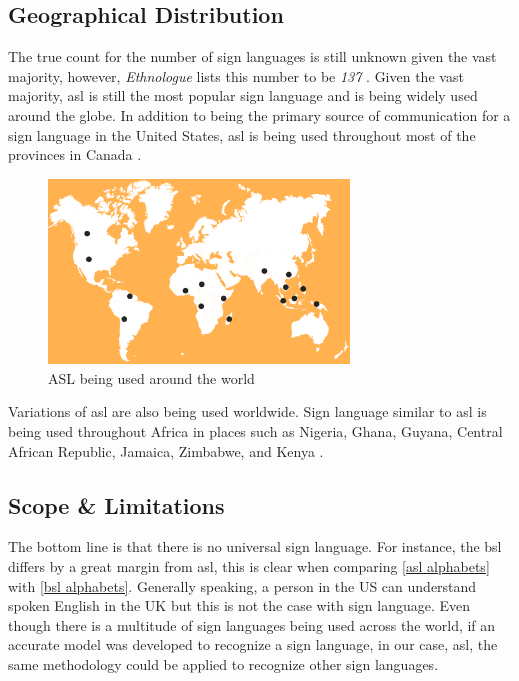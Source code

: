 \documentclass[twocolumn]{article}
\begin{document}
\subsection{Geographical Distribution}

The true count for the number of sign languages is still unknown given the 
vast majority, however, \textit{Ethnologue} \cite{ethnologue} lists this 
number to be \textit{137} \cite{fenlon2015sign}. Given the vast majority, 
\gls{asl} is still the most popular sign language and is being widely used 
around the globe. In addition to being the primary source of communication for 
a sign language in the United States, \gls{asl} is being used throughout most 
of the provinces in Canada \cite{al2010sign}.

\begin{figure}[h]
\centering
\includegraphics[width=8cm]{./figures/asl being used around the world}
\caption{ASL being used around the world}
\end{figure}

Variations of \gls{asl} are also being used worldwide. Sign language 
similar to \gls{asl} is being used throughout Africa in places such as 
Nigeria, Ghana, Guyana, Central African Republic, Jamaica, Zimbabwe, and 
Kenya \cite{nyst2010sign}.

\subsection{Scope \& Limitations}

The bottom line is that there is no universal sign language. For instance, the 
\gls{bsl} differs by a great margin from \gls{asl}, this is clear when 
comparing \autoref{asl alphabets} with \autoref{bsl alphabets}. Generally 
speaking, a person in the US can understand spoken English in the UK but this 
is not the case with sign language. Even though there is a multitude of sign 
languages being used across the world, if an accurate model was developed to 
recognize a sign language, in our case, \gls{asl}, the same methodology could 
be applied to recognize other sign languages.
\end{document}

